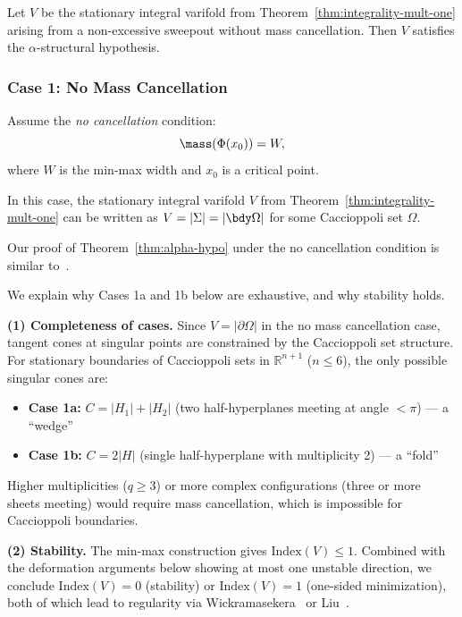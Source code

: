\begin{theorem}\label{thm:alpha-hypo}
    Let $V$ be the stationary integral varifold from Theorem~\ref{thm:integrality-mult-one} arising from a
    non-excessive sweepout without mass cancellation. Then $V$ satisfies the $\alpha$-structural hypothesis.
\end{theorem}

\subsubsection{Case 1: No Mass Cancellation}

Assume the \emph{no cancellation} condition:
\begin{equation}
    \mass(\Phi(x_0)) = W,
\end{equation}
where $W$ is the min-max width and $x_0$ is a critical point.

In this case, the stationary integral varifold $V$ from Theorem~\ref{thm:integrality-mult-one} can be written as
$V = |\Sigma| = |\bdy\Omega|$ for some Caccioppoli set $\Omega$.

Our proof of Theorem~\ref{thm:alpha-hypo} under the no cancellation condition is similar to~\cite[Lemma 3.4]{CLS22}.

\begin{remark}\label{rem:case-completeness}
We explain why Cases 1a and 1b below are exhaustive, and why stability holds.

\textbf{(1) Completeness of cases.} Since $V = |\partial\Omega|$ in the no mass cancellation case, tangent cones at singular points are constrained by the Caccioppoli set structure. For stationary boundaries of Caccioppoli sets in $\mathbb{R}^{n+1}$ ($n \leq 6$), the only possible singular cones are:
\begin{itemize}
    \item \textbf{Case 1a:} $C = |H_1| + |H_2|$ (two half-hyperplanes meeting at angle $< \pi$) --- a ``wedge''
    \item \textbf{Case 1b:} $C = 2|H|$ (single half-hyperplane with multiplicity 2) --- a ``fold''
\end{itemize}
Higher multiplicities ($q \geq 3$) or more complex configurations (three or more sheets meeting) would require mass cancellation, which is impossible for Caccioppoli boundaries.

\textbf{(2) Stability.} The min-max construction gives $\mathrm{Index}(V) \leq 1$. Combined with the deformation arguments below showing at most one unstable direction, we conclude $\mathrm{Index}(V) = 0$ (stability) or $\mathrm{Index}(V) = 1$ (one-sided minimization), both of which lead to regularity via Wickramasekera~\cite{Wic14} or Liu~\cite{Liu19}.
\end{remark}

